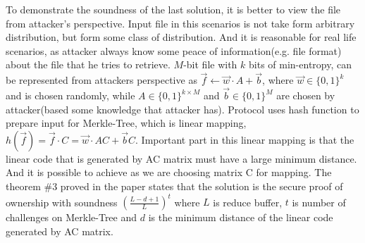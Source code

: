 \documentclass[12pt]{article}
\begin{document}
To demonstrate the soundness of the last solution, it is better to view the file from attacker's perspective. Input file in this scenarios is not take form arbitrary distribution, but form some class of distribution. And it is reasonable for real life scenarios, as attacker always know some peace of information(e.g. file format) about the file that he tries to retrieve. $M$-bit file with $k$ bits of min-entropy, can be represented from attackers perspective as $\vec{f}\leftarrow\vec{w}\cdot A +\vec{b}$, where $\vec{w} \in \{0,1\}^k$  and is chosen randomly, while $A\in\{0,1\}^{k\times M}$ and $\vec{b}\in\{0,1\}^M$ are chosen by attacker(based some knowledge that attacker has). Protocol uses hash function to prepare input for Merkle-Tree, which is linear mapping, $h(\vec{f})=\vec{f}\cdot C = \vec{w}\cdot AC + \vec{b}C$.\cite{PoW} Important part in this linear mapping is that the linear code that is generated by AC matrix must have a large minimum distance. And it is possible to achieve as we are choosing matrix C for mapping. The theorem \#3 proved in the paper states that the solution is the secure proof of ownership with soundness $\left( \frac{L-d+1}{L}\right)^t$ where $L$ is reduce buffer, $t$ is number of challenges on Merkle-Tree and $d$ is the minimum distance of the linear code generated by AC matrix.
\\\\
\end{document}
